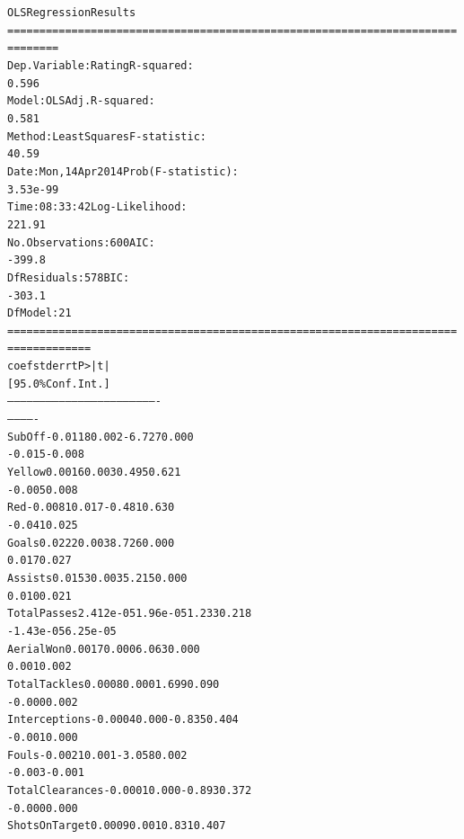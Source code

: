 \documentclass[letterpaper,10pt,english]{/usr/local/lib/python2.7/dist-packages/sphinx/texinputs/sphinxhowto}
\newenvironment{ColorVerbatim}
        {\begin{mdframed}[%
            roundcorner=1.0pt, %
            backgroundcolor=nbframe-bg, %
            userdefinedwidth=1\linewidth, %
            leftmargin=0.1\linewidth, %
            innerleftmargin=0pt, %
            innerrightmargin=0pt, %
            linecolor=nbframe-border, %
            linewidth=1pt, %
            usetwoside=false, %
            everyline=true, %
            innerlinewidth=3pt, %
            innerlinecolor=nbframe-bg, %
            middlelinewidth=1pt, %
            middlelinecolor=nbframe-bg, %
            outerlinewidth=0.5pt, %
            outerlinecolor=nbframe-border, %
            needspace=0pt
        ]}
        {\end{mdframed}}
\newenvironment{InvisibleVerbatim}
        {\begin{mdframed}[leftmargin=0.1\linewidth,innerleftmargin=3pt,innerrightmargin=3pt, userdefinedwidth=1\linewidth, linewidth=0pt, linecolor=white, usetwoside=false]}
        {\end{mdframed}}
\begin{document}
\begin{ColorVerbatim}
            
                \vspace{-0.2\baselineskip}
            
        \end{ColorVerbatim}
    

    

        
        

            
                \begin{InvisibleVerbatim}
                \vspace{-0.5\baselineskip}
\begin{alltt}                            OLS Regression Results
======================================================================
========
Dep. Variable:                 Rating   R-squared:
0.596
Model:                            OLS   Adj. R-squared:
0.581
Method:                 Least Squares   F-statistic:
40.59
Date:                Mon, 14 Apr 2014   Prob (F-statistic):
3.53e-99
Time:                        08:33:42   Log-Likelihood:
221.91
No. Observations:                 600   AIC:
-399.8
Df Residuals:                     578   BIC:
-303.1
Df Model:                          21
======================================================================
=============
                      coef    std err          t      P>|t|
[95.0\% Conf. Int.]
----------------------------------------------------------------------
-------------
SubOff             -0.0118      0.002     -6.727      0.000
-0.015    -0.008
Yellow              0.0016      0.003      0.495      0.621
-0.005     0.008
Red                -0.0081      0.017     -0.481      0.630
-0.041     0.025
Goals               0.0222      0.003      8.726      0.000
0.017     0.027
Assists             0.0153      0.003      5.215      0.000
0.010     0.021
TotalPasses      2.412e-05   1.96e-05      1.233      0.218
-1.43e-05  6.25e-05
AerialWon           0.0017      0.000      6.063      0.000
0.001     0.002
TotalTackles        0.0008      0.000      1.699      0.090
-0.000     0.002
Interceptions      -0.0004      0.000     -0.835      0.404
-0.001     0.000
Fouls              -0.0021      0.001     -3.058      0.002
-0.003    -0.001
TotalClearances    -0.0001      0.000     -0.893      0.372
-0.000     0.000
ShotsOnTarget       0.0009      0.001      0.831      0.407

\end{alltt}
\end{InvisibleVerbatim}
\end{document}
